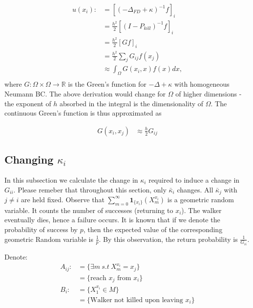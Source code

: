 \documentclass[paper=a4, fontsize=11pt]{scrartcl} %
\numberwithin{equation}{section} %
\numberwithin{figure}{section} %
\numberwithin{table}{section} %
\begin{document}
\begin{align*}
  u(x_i) :&=[( -\Delta_{FD} + \kappa )^{-1}f]_i \\
  &=\frac{h^2}{2}[(I - P_{kill})^{-1}f]_i \\ 
  &=\frac{h^2}{2}[Gf]_i \\
  &=\frac{h^2}{2}\sum_{j}G_{ij}f(x_j) \\
  &\approx\int_{\Omega}G(x_i,x)f(x)dx, \\
\end{align*}
where $G: \Omega \times \Omega \to \mathbb{R}$ is the Green's function for $-\Delta + \kappa$ with
homogeneous Neumann BC. The above derivation would
change for $\Omega$ of higher dimensions - the 
exponent of $h$ absorbed in the integral is the dimensionality of $\Omega$.
The continuous Green's function is thus approximated as

\begin{align}\label{G_cont}
  G(x_i,x_j) &\approx \frac{h}{2} G_{ij} 
\end{align}



\subsection{Changing $\kappa_i$}
In this subsection we calculate the change in $\kappa_i$ required
to induce a change in $G_{ii}$. Please remeber that throughout this section,
only $\bar{\kappa}_i$ changes. All $\bar{\kappa}_{j}$ with $j \neq i$ are held 
fixed.
Observe that  $\sum_{m=0}^{\infty} \mathbf{1}_{ \{x_i\} }(X^{x_i}_m)$ 
is a geometric random variable. It counts
the number of successes (returning to $x_i$). The walker eventually dies, hence a failure occurs. 
It is known that if we denote the probability of success by $p$, then the
expected value of the corresponding geometric Random variable is $\frac{1}{p}$. 
By this observation,
the return probability is $\frac{1}{G_{ii}}$. 

Denote:
\begin{align*}
  A_{ij} :&= \{ \exists m \ s.t \ X^{x_i}_m = x_j \} \\
  &= \{ \text{reach $x_j$ from $x_i$} \}\\
  B_i :&= \{ X^{x_i}_1 \in M \} \\
  &=\{\text{Walker not killed upon leaving $x_i$} \}\\
\end{align*}
\end{document}
